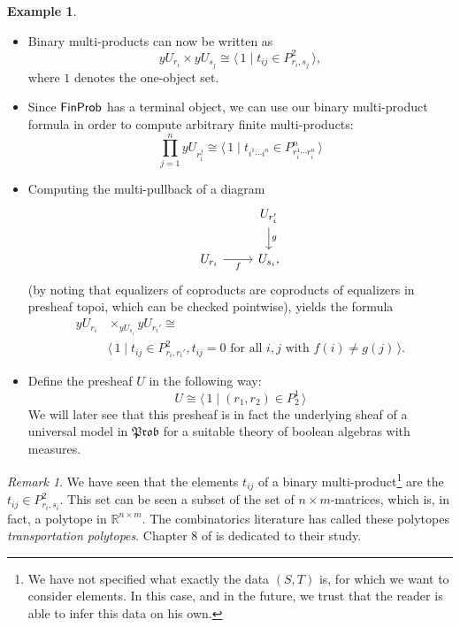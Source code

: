 \documentclass[a4paper]{amsproc}
\theoremstyle{plain}
\theoremstyle{definition}
\newtheorem{example}[theorem]{Example}
\theoremstyle{remark}
\newtheorem{remark}[theorem]{Remark}
\numberwithin{equation}{section}
\newcommand{\y}{\textit{y}}
\newcommand{\FinProb}{\textup{\textsf{FinProb}}}
\newcommand{\Prob}{\mathfrak{Prob}}
\newcommand{\la}{\langle\,}
\newcommand{\ra}{\,\rangle}
\begin{document}
\begin{example} \label{notation_example}
    \mbox{}
    \begin{itemize}
        \item Binary multi-products can now be written as
        \[ \y U_{r_i} \times \y U_{s_j} \cong \la 1 \mid t_{ij} \in P^2_{r_i,s_j} \ra, \]
        where $1$ denotes the one-object set.
        \item Since $\FinProb$ has a terminal object, we can use our binary multi-product formula in order to compute arbitrary finite multi-products:
        \[
            \prod_{j=1}^n \y U_{r_i^j} \cong \la 1 \mid t_{i^1 \cdots i^n} \in P^n_{r_i^1 \cdots r_i^n} \ra
        \]
        \item Computing the multi-pullback of a diagram
        \[
            \begin{tikzcd}
            & U_{r'_i} \arrow[d, "g"] \\
            U_{r_i} \arrow[r, "f"'] & U_{s_i} ,
            \end{tikzcd}
        \]
        (by noting that equalizers of coproducts are coproducts of equalizers in presheaf topoi, which can be checked pointwise), yields the formula
        \begin{equation*}
            \begin{split}
            \y U_{r_i} &\times_{\y U_{s_i}} \y U_{r_i'} \cong \\
            &\la 1 \mid t_{ij} \in P^2_{r_i, r_i'}, t_{ij} = 0 \text{ for all } i,j \text{ with } f(i) \neq g(j) \ra .
            \end{split}
        \end{equation*}
        \item Define the presheaf $U$ in the following way:
        \[ U \cong \la 1 \mid (r_1,r_2) \in P^1_2 \ra \]
        We will later see that this presheaf is in fact the underlying sheaf of a universal model in $\Prob$ for a suitable theory of boolean algebras with measures.
    \end{itemize}
\end{example}

\begin{remark} We have seen that the elements $t_{ij}$ of a binary multi-product\footnote{We have not specified what exactly the data $(S,T)$ is, for which we want to consider elements. In this case, and in the future, we trust that the reader is able to infer this data on his own.} are the $t_{ij} \in P^2_{r_i,s_i}$. This set can be seen a subset of the set of $n\times m$-matrices, which is, in fact, a polytope in $\mathbb{R}^{n\times m}$. The combinatorics literature has called these polytopes \emph{transportation polytopes}. Chapter 8 of \cite{brualdi2006combinatorial} is dedicated to their study.
\end{remark}
\end{document}
